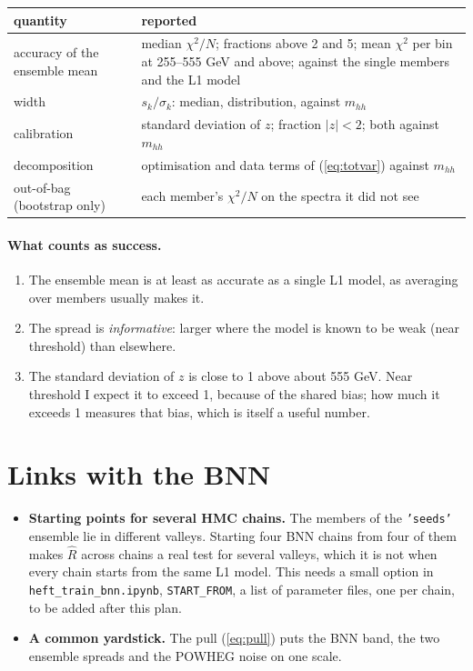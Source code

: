 \documentclass[11pt]{article}
\newcommand{\file}[1]{\nolinkurl{#1}}
\newcommand{\code}[1]{\texttt{#1}}
\newcommand{\mhh}{m_{hh}}
\begin{document}
\begin{center}
\small
\begin{tabular}{p{}p{}}
\toprule
quantity & reported\\
\midrule
accuracy of the ensemble mean & median $\chi^2/N$; fractions above 2 and 5; mean $\chi^2$ per
  bin at 255--555 GeV and above; against the single members and the L1 model\\
width & $s_k/\sigma_k$: median, distribution, against $\mhh$\\
calibration & standard deviation of $z$; fraction $|z| < 2$; both against $\mhh$\\
decomposition & optimisation and data terms of (\ref{eq:totvar}) against $\mhh$\\
out-of-bag (bootstrap only) & each member's $\chi^2/N$ on the spectra it did not see\\
\bottomrule
\end{tabular}
\end{center}

\paragraph{What counts as success.}
\begin{enumerate}
  \item The ensemble mean is at least as accurate as a single L1 model, as averaging over
    members usually makes it.
  \item The spread is \emph{informative}: larger where the model is known to be weak
    (near threshold) than elsewhere.
  \item The standard deviation of $z$ is close to 1 above about 555 GeV. Near threshold I
    expect it to exceed 1, because of the shared bias; how much it exceeds 1 measures that
    bias, which is itself a useful number.
\end{enumerate}

\section{Links with the BNN}

\begin{itemize}
  \item \textbf{Starting points for several HMC chains.} The members of the
    \code{'seeds'} ensemble lie in different valleys. Starting four BNN chains from four of
    them makes $\hat R$ across chains a real test for several valleys, which it is not when
    every chain starts from the same L1 model. This needs a small option in
    \file{heft_train_bnn.ipynb}, \code{START\_FROM}, a list of parameter files, one per
    chain, to be added after this plan.
  \item \textbf{A common yardstick.} The pull (\ref{eq:pull}) puts the BNN band, the two
    ensemble spreads and the POWHEG noise on one scale.
\end{itemize}
\end{document}
